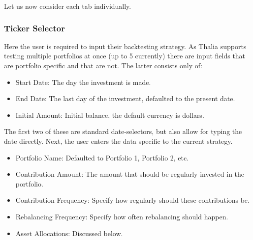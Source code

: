 \documentclass[main.tex]{subfiles}
\begin{document}
Let us now consider each tab individually. 



\subsubsection{Ticker Selector}



Here the user is required to input their backtesting strategy. As Thalia supports testing multiple portfolios at once (up to 5 currently) there are input fields that are portfolio specific and that are not. The latter consists only of:



\begin{itemize}

    \item Start Date: The day the investment is made.

    \item End Date: The last day of the investment, defaulted to the present date.

    \item Initial Amount: Initial balance, the default currency is dollars.

\end{itemize}



The first two of these are standard date-selectors, but also allow for typing the date directly. Next, the user enters the data specific to the current strategy.



\begin{itemize}

    \item Portfolio Name: Defaulted to Portfolio 1, Portfolio 2, etc. 

    \item Contribution Amount: The amount that should be regularly invested in the portfolio.

    \item Contribution Frequency: Specify how regularly should these contributions be.

    \item Rebalancing Frequency: Specify how often rebalancing should happen. 

    \item Asset Allocations: Discussed below.

\end{itemize}
\end{document}
